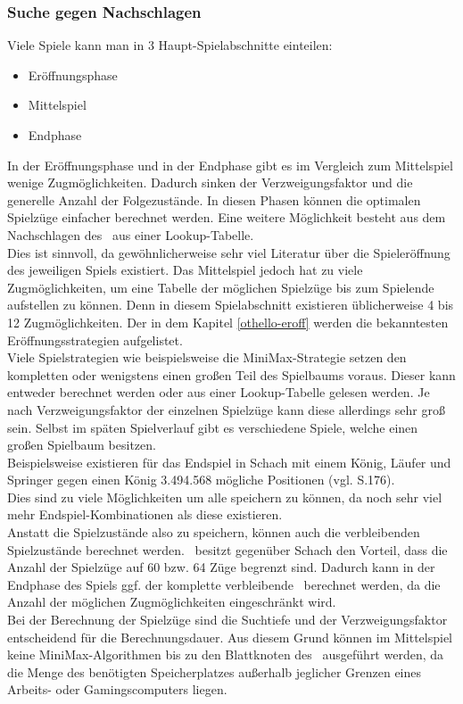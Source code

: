 \subsubsection{Suche gegen Nachschlagen}
\label{lookup}
Viele Spiele kann man in 3 Haupt-Spielabschnitte einteilen:
\begin{itemize}
\item Eröffnungsphase
\item Mittelspiel
\item Endphase
\end{itemize}
In der Eröffnungsphase und in der Endphase gibt es im Vergleich zum Mittelspiel wenige Zugmöglichkeiten. Dadurch sinken der Verzweigungsfaktor und die generelle Anzahl der Folgezustände. In diesen Phasen können die optimalen Spielzüge einfacher berechnet werden. Eine weitere Möglichkeit besteht aus dem Nachschlagen des \states\ aus einer Lookup-Tabelle.
\\Dies ist sinnvoll, da gewöhnlicherweise sehr viel Literatur über die Spieleröffnung des jeweiligen Spiels existiert. %
Das Mittelspiel jedoch hat zu viele Zugmöglichkeiten, um eine Tabelle der möglichen Spielzüge bis zum Spielende aufstellen zu können. Denn in diesem Spielabschnitt existieren üblicherweise 4 bis 12 Zugmöglichkeiten. Der in dem Kapitel \ref{othello-eroff} werden die bekanntesten Eröffnungsstrategien aufgelistet.
\\Viele Spielstrategien wie beispielsweise die MiniMax-Strategie setzen den kompletten oder wenigstens einen großen Teil des Spielbaums voraus. Dieser kann entweder berechnet werden oder aus einer Lookup-Tabelle gelesen werden. Je nach Verzweigungsfaktor der einzelnen Spielzüge kann diese allerdings sehr groß sein. Selbst im späten Spielverlauf gibt es verschiedene Spiele, welche einen großen Spielbaum besitzen.
\\Beispielsweise existieren für das Endspiel in Schach mit einem König, Läufer und Springer gegen einen König 3.494.568 mögliche Positionen (vgl. \cite{Russell.2016} S.176).
\\Dies sind zu viele Möglichkeiten um alle speichern zu können, da noch sehr viel mehr Endspiel-Kombinationen als diese existieren.
\\Anstatt die Spielzustände also zu speichern, können auch die verbleibenden Spielzustände berechnet werden. \ot\ besitzt gegenüber Schach den Vorteil, dass die Anzahl der Spielzüge auf 60 bzw. 64 Züge begrenzt sind. Dadurch kann in der Endphase des Spiels ggf. der komplette verbleibende \gtree\ berechnet werden, da die Anzahl der möglichen Zugmöglichkeiten eingeschränkt wird.
\\Bei der Berechnung der Spielzüge sind die Suchtiefe und der Verzweigungsfaktor entscheidend für die Berechnungsdauer. Aus diesem Grund können im Mittelspiel keine MiniMax-Algorithmen bis zu den Blattknoten des \gtrees\ ausgeführt werden, da die Menge des benötigten Speicherplatzes außerhalb jeglicher Grenzen eines Arbeits- oder Gamingscomputers liegen.

